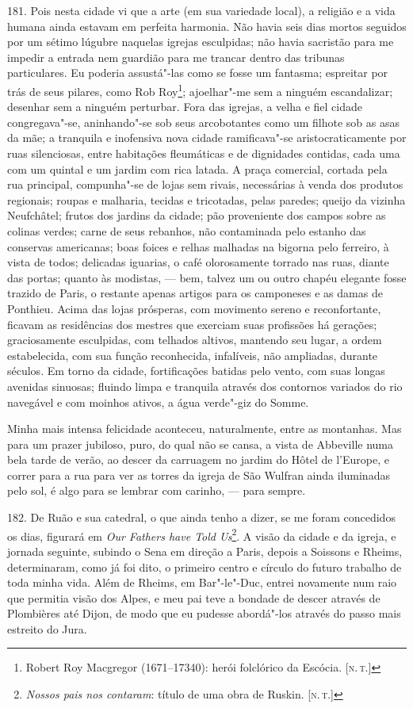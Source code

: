 181. Pois nesta cidade vi que a arte (em sua variedade local), a
religião e a vida humana ainda estavam em perfeita harmonia. Não havia
seis dias mortos seguidos por um sétimo lúgubre naquelas igrejas
esculpidas; não havia sacristão para me impedir a entrada nem guardião
para me trancar dentro das tribunas particulares. Eu poderia assustá"-las
como se fosse um fantasma; espreitar por trás de seus pilares, como Rob
Roy\footnote{Robert Roy Macgregor (1671--17340): herói folclórico da
  Escócia. {[}\textsc{n.\,t.}{]}}; ajoelhar"-me sem a ninguém escandalizar;
desenhar sem a ninguém perturbar. Fora das igrejas, a velha e fiel
cidade congregava"-se, aninhando"-se sob seus arcobotantes como um filhote
sob as asas da mãe; a tranquila e inofensiva nova cidade ramificava"-se
aristocraticamente por ruas silenciosas, entre habitações fleumáticas e
de dignidades contidas, cada uma com um quintal e um jardim com rica
latada. A praça comercial, cortada pela rua principal, compunha"-se de
lojas sem rivais, necessárias à venda dos produtos regionais; roupas e
malharia, tecidas e tricotadas, pelas paredes; queijo da vizinha
Neufchâtel; frutos dos jardins da cidade; pão proveniente dos campos
sobre as colinas verdes; carne de seus rebanhos, não contaminada pelo
estanho das conservas americanas; boas foices e relhas malhadas na
bigorna pelo ferreiro, à vista de todos; delicadas iguarias, o café
olorosamente torrado nas ruas, diante das portas; quanto às modistas, ---
bem, talvez um ou outro chapéu elegante fosse trazido de Paris, o
restante apenas artigos para os camponeses e as damas de Ponthieu. Acima
das lojas prósperas, com movimento sereno e reconfortante, ficavam as
residências dos mestres que exerciam suas profissões há gerações;
graciosamente esculpidas, com telhados altivos, mantendo seu lugar, a
ordem estabelecida, com sua função reconhecida, infalíveis, não
ampliadas, durante séculos. Em torno da cidade, fortificações batidas
pelo vento, com suas longas avenidas sinuosas; fluindo limpa e tranquila
através dos contornos variados do rio navegável e com moinhos ativos, a
água verde"-giz do Somme.

Minha mais intensa felicidade aconteceu, naturalmente, entre as
montanhas. Mas para um prazer jubiloso, puro, do qual não se cansa, a
vista de Abbeville numa bela tarde de verão, ao descer da carruagem no
jardim do Hôtel de l'Europe, e correr para a rua para ver as torres da
igreja de São Wulfran ainda iluminadas pelo sol, é algo para se lembrar
com carinho, --- para sempre.

182. De Ruão e sua catedral, o que ainda tenho a dizer, se me foram
concedidos os dias, figurará em \emph{Our Fathers have Told
Us}\footnote{\emph{Nossos pais nos contaram}: título de uma obra de
  Ruskin. {[}\textsc{n.\,t.}{]}}. A visão da cidade e da igreja, e jornada
seguinte, subindo o Sena em direção a Paris, depois a Soissons e Rheims,
determinaram, como já foi dito, o primeiro centro e círculo do futuro
trabalho de toda minha vida. Além de Rheims, em Bar"-le"-Duc, entrei
novamente num raio que permitia visão dos Alpes, e meu pai teve a
bondade de descer através de Plombières até Dijon, de modo que eu
pudesse abordá"-los através do passo mais estreito do Jura.


